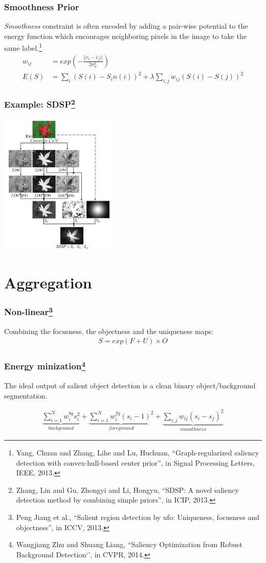 \documentclass[notheorems,serif,table,compress]{beamer}  %
\begin{document}
\begin{frame}
\frametitle{Smoothness Prior}
{\color{blue}\emph{Smoothness}} constraint is often encoded by adding a pair-wise potential to the energy function which encourages neighboring pixels in the image to take the same label.\footnote{Yang, Chuan and Zhang, Lihe and Lu, Huchuan, ``Graph-regularized saliency detection with convex-hull-based center prior'', in Signal Processing Letters, IEEE, 2013.}
\begin{align}
w_{ij} & = exp\left(-\frac{||c_i-c_j||}{2\sigma_w^2}\right)\\
E(S) & = \sum_{i}(S(i)-S_in(i))^2+\lambda \sum_{i, j}w_{ij}(S(i)-S(j))^2
\end{align}
\end{frame}


\begin{frame}
\frametitle{Example: SDSP\footnote{Zhang, Lin and Gu, Zhongyi and Li, Hongyu, ``SDSP: A novel saliency detection method by combining simple priors'', in ICIP, 2013.}}

\centering\includegraphics[width=5.7cm]{SDSP}
\end{frame}


\section{Aggregation}

\begin{frame}
\frametitle{Non-linear\footnote{Peng Jiang et al., ``Salient region detection by ufo: Uniqueness, focusness and objectness'', in ICCV, 2013. }}
Combining the focusness, the objectness and the uniqueness maps:
\begin{align}
S = exp( F + U) \times O
\end{align}
\end{frame}


\begin{frame}
\frametitle{Energy minization\footnote{Wangjiang Zhu and Shuang Liang, ``Saliency Optimization from Robust Background Detection‘’, in CVPR, 2014.}}
The ideal output of salient object detection is a clean binary object/background segmentation.

\begin{align}
\underbrace{\sum_{i=1}^{N}w_i^{bg}s_i^2}_{background}+\underbrace{\sum_{i=1}^{N}w_i^{fg}(s_i-1)^2}_{foreground}+\underbrace{\sum_{i, j}w_{ij}(s_i-s_j)^2}_{smoothness}
\end{align}
\end{frame}
\end{document}
